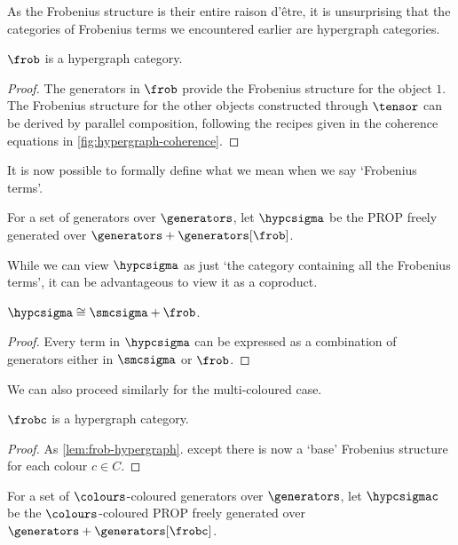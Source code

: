 As the Frobenius structure is their entire raison d'\^{e}tre, it is unsurprising
that the categories of Frobenius terms we encountered earlier are hypergraph
categories.

\begin{lemma}\label{lem:frob-hypergraph}
    \(\frob\) is a hypergraph category.
\end{lemma}
\begin{proof}
    The generators in \(\frob\) provide the Frobenius structure for the object
    \(1\).
    The Frobenius structure for the other objects constructed through
    \(\tensor\) can be derived by parallel composition, following the recipes
    given in the coherence equations in \cref{fig:hypergraph-coherence}.
\end{proof}

It is now possible to formally define what we mean when we say `Frobenius
terms'.

\begin{definition}
    For a set of generators over \(\generators\), let \(\hypcsigma\) be the PROP
    freely generated over \(\generators + \generators[\frob]\).
\end{definition}

While we can view \(\hypcsigma\) as just `the category containing all the
Frobenius terms', it can be advantageous to view it as a coproduct.

\begin{lemma}
    \(\hypcsigma \cong \smcsigma + \frob\).
\end{lemma}
\begin{proof}
    Every term in \(\hypcsigma\) can be expressed as a combination of
    generators either in \(\smcsigma\) or \(\frob\).
\end{proof}

We can also proceed similarly for the multi-coloured case.

\begin{lemma}\label{lem:frobc-hypergraph}
    \(\frobc\) is a hypergraph category.
\end{lemma}
\begin{proof}
    As \cref{lem:frob-hypergraph}. except there is now a `base' Frobenius
    structure for each colour \(c \in C\).
\end{proof}

\begin{definition}
    For a set of \(\colours\)-coloured generators over \(\generators\), let
    \(\hypcsigmac\) be the \(\colours\)-coloured PROP freely generated over
    \(\generators + \generators[\frobc]\).
\end{definition}


